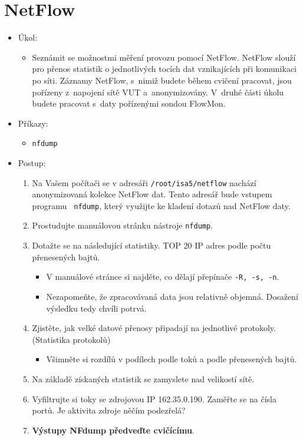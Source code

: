 \newpage

\section{NetFlow}
\begin{itemize}
	\item Úkol:
	\begin{itemize}
		\item Seznámit se možnostmi měření provozu pomocí NetFlow. NetFlow slouží pro
		přenos statistik o jednotlivých tocích dat vznikajících při komunikaci po síti.
		Záznamy NetFlow, s~nimiž budete během cvičení pracovat, jsou
		pořízeny z~napojení sítě VUT a~anonymizovány. V~druhé části úkolu
		budete pracovat s~daty pořízenými sondou FlowMon.
	\end{itemize}
	\item Příkazy:
	\begin{itemize}
		\item {\tt nfdump}
	\end{itemize}
	\item Postup:
	\begin{enumerate}
		\item Na Vašem počítači se v adresáři {\tt /root/isa5/netflow} nachází
		anonymizovaná kolekce NetFlow dat. Tento adresář bude vstupem programu
		{\tt
nfdump}, který využijte ke kladení dotazů nad NetFlow daty.
		\item Prostudujte manuálovou stránku nástroje {\tt nfdump}.
		\item Dotažte se na následující statistiky. TOP 20 IP adres podle počtu přenesených bajtů. 
		\begin{itemize}
			\item V manuálové stránce si najděte, co dělají přepínače {\tt -R, -s, -n}.
			\item Nezapomeňte, že zpracovávaná data jsou relativně objemná. Dosažení výsledku tedy chvíli potrvá.
		\end{itemize}
		\item Zjistěte, jak velké datové přenosy připadají na jednotlivé protokoly. (Statistika protokolů)
		\begin{itemize}
			\item Všimněte si rozdílů v podílech podle toků a podle přenesených bajtů.
		\end{itemize}
		\item Na základě získaných statistik se zamyslete nad velikostí sítě.
		\item Vyfiltrujte si toky se zdrojovou IP 162.35.0.190. Zaměřte se na čísla portů.
		Je aktivita zdroje něčím podezřelá?
		
		\item {\bf Výstupy NFdump předveďte cvičícímu}.
	\end{enumerate}
\end{itemize}

